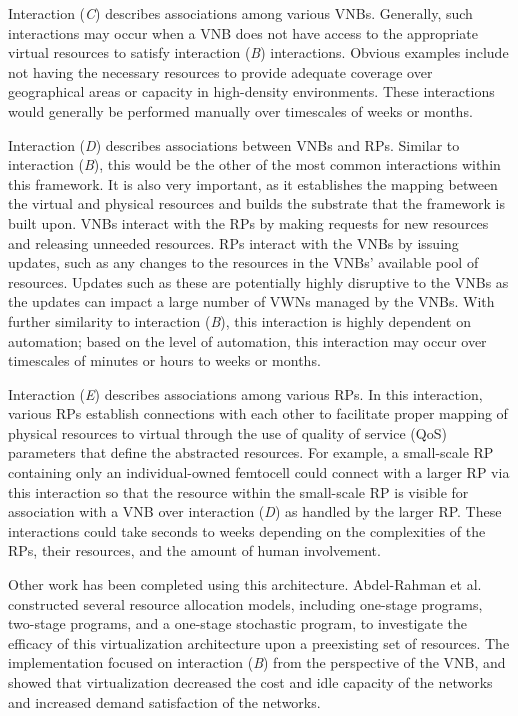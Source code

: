 \documentclass[12pt,dvipsnames]{report}
\begin{document}
Interaction (\emph{C}) describes associations among various VNBs.  Generally, such interactions may occur when a VNB does not have access to the appropriate virtual resources to satisfy interaction (\emph{B}) interactions.  Obvious examples include not having the necessary resources to provide adequate coverage over geographical areas or capacity in high-density environments.  These interactions would generally be performed manually over timescales of weeks or months.

Interaction (\emph{D}) describes associations between VNBs and RPs.  Similar to interaction (\emph{B}), this would be the other of the most common interactions within this framework.  It is also very important, as it establishes the mapping between the virtual and physical resources and builds the substrate that the framework is built upon.  VNBs interact with the RPs by making requests for new resources and releasing unneeded resources.  RPs interact with the VNBs by issuing updates, such as any changes to the resources in the VNBs' available pool of resources.  Updates such as these are potentially highly disruptive to the VNBs as the updates can impact a large number of VWNs managed by the VNBs.  With further similarity to interaction (\emph{B}), this interaction is highly dependent on automation; based on the level of automation, this interaction may occur over timescales of minutes or hours to weeks or months.

Interaction (\emph{E}) describes associations among various RPs.  In this interaction, various RPs establish connections with each other to facilitate proper mapping of physical resources to virtual through the use of quality of service (QoS) parameters that define the abstracted resources.  For example, a small-scale RP containing only an individual-owned femtocell could connect with a larger RP via this interaction so that the resource within the small-scale RP is visible for association with a VNB over interaction (\emph{D}) as handled by the larger RP.  These interactions could take seconds to weeks depending on the complexities of the RPs, their resources, and the amount of human involvement.

Other work has been completed using this architecture.  Abdel-Rahman et al.~\cite{MJ_CCNC_16} constructed several resource allocation models, including one-stage programs, two-stage programs, and a one-stage stochastic program, to investigate the efficacy of this virtualization architecture upon a preexisting set of resources.  The implementation focused on interaction (\emph{B}) from the perspective of the VNB, and showed that virtualization decreased the cost and idle capacity of the networks and increased demand satisfaction of the networks.
\end{document}
